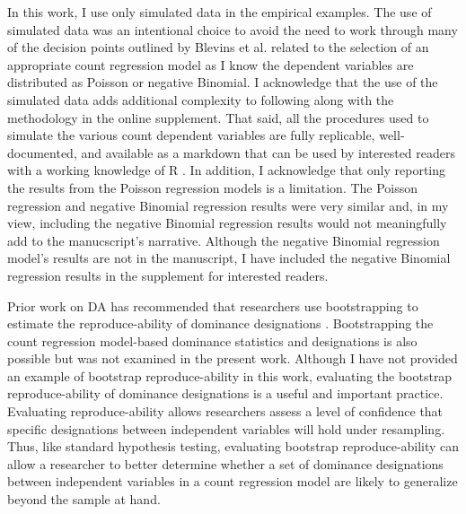 \documentclass[man]{apa7}
\begin{document}
	In this work, I use only simulated data in the empirical examples.
	The use of simulated data was an intentional choice to avoid the need to work through many of the decision points outlined by Blevins et al. \parencite*{blevins2015count} related to the selection of an appropriate count regression model as I know the dependent variables are distributed as Poisson or negative Binomial.
	I acknowledge that the use of the simulated data adds additional complexity to following along with the methodology in the online supplement.
	That said, all the procedures used to simulate the various count dependent variables are fully replicable, well-documented, and available as a markdown that can be used by interested readers with a working knowledge of R \parencite{R}.
	In addition, I acknowledge that only reporting the results from the Poisson regression models is a limitation.
	The Poisson regression and negative Binomial regression results were very similar and, in my view, including the negative Binomial regression results would not meaningfully add to the manucscript's narrative.
	Although the negative Binomial regression model's results are not in the manuscript, I have included the negative Binomial regression results in the supplement for interested readers.
	
	Prior work on DA has recommended that researchers use bootstrapping to estimate the reproduce-ability of dominance designations \parencite{azen2003dominance}. 
	Bootstrapping the count regression model-based dominance statistics and designations is also possible but was not examined in the present work.
	Although I have not provided an example of bootstrap reproduce-ability in this work, evaluating the bootstrap reproduce-ability of dominance designations is a useful and important practice.
	Evaluating reproduce-ability allows researchers assess a level of confidence that specific designations between independent variables will hold under resampling.
	Thus, like standard hypothesis testing, evaluating bootstrap reproduce-ability can allow a researcher to better determine whether a set of dominance designations between independent variables in a count regression model are likely to generalize beyond the sample at hand.
	
\end{document}
